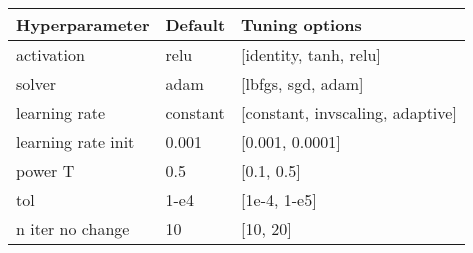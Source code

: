 
\begin{tabular}{|l|l|l|} 
\hline
\textbf{Hyperparameter}& \textbf{Default} & \textbf{Tuning options}\\
\hline
activation & relu & [identity, tanh, relu] \\
\hline
solver & adam & [lbfgs, sgd, adam] \\
\hline
learning rate & constant & [constant, invscaling, adaptive] \\
\hline
learning rate init & 0.001 & [0.001, 0.0001] \\
\hline
power T & 0.5 & [0.1, 0.5] \\
\hline
tol & 1-e4 & [1e-4, 1-e5] \\
\hline
n iter no change & 10 & [10, 20] \\
\hline
\end{tabular}
